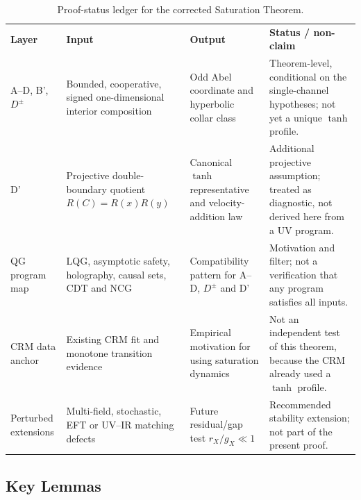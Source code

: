 \documentclass[aps,prd,twocolumn,superscriptaddress,nofootinbib]{revtex4-2}
\begin{document}
\begin{table}[t]
\caption{Proof-status ledger for the corrected Saturation Theorem.}
\label{tab:proof_status_ledger}
\small
\begin{ruledtabular}
\begin{tabular}{@{}llll@{}}
\parbox[t]{0.14\textwidth}{\textbf{Layer}} & \parbox[t]{0.24\textwidth}{\textbf{Input}} & \parbox[t]{0.22\textwidth}{\textbf{Output}} & \parbox[t]{0.27\textwidth}{\textbf{Status / non-claim}} \\
\parbox[t]{0.14\textwidth}{A--D, B', $D^\pm$} & \parbox[t]{0.24\textwidth}{Bounded, cooperative, signed one-dimensional interior composition} & \parbox[t]{0.22\textwidth}{Odd Abel coordinate and hyperbolic collar class} & \parbox[t]{0.27\textwidth}{Theorem-level, conditional on the single-channel hypotheses; not yet a unique $\tanh$ profile.} \\[0.6em]
\parbox[t]{0.14\textwidth}{D'} & \parbox[t]{0.24\textwidth}{Projective double-boundary quotient $R(C)=R(x)R(y)$} & \parbox[t]{0.22\textwidth}{Canonical $\tanh$ representative and velocity-addition law} & \parbox[t]{0.27\textwidth}{Additional projective assumption; treated as diagnostic, not derived here from a UV program.} \\[0.6em]
\parbox[t]{0.14\textwidth}{QG program map} & \parbox[t]{0.24\textwidth}{LQG, asymptotic safety, holography, causal sets, CDT and NCG} & \parbox[t]{0.22\textwidth}{Compatibility pattern for A--D, $D^\pm$ and D'} & \parbox[t]{0.27\textwidth}{Motivation and filter; not a verification that any program satisfies all inputs.} \\[0.6em]
\parbox[t]{0.14\textwidth}{CRM data anchor} & \parbox[t]{0.24\textwidth}{Existing CRM fit and monotone transition evidence} & \parbox[t]{0.22\textwidth}{Empirical motivation for using saturation dynamics} & \parbox[t]{0.27\textwidth}{Not an independent test of this theorem, because the CRM already used a $\tanh$ profile.} \\[0.6em]
\parbox[t]{0.14\textwidth}{Perturbed extensions} & \parbox[t]{0.24\textwidth}{Multi-field, stochastic, EFT or UV--IR matching defects} & \parbox[t]{0.22\textwidth}{Future residual/gap test $r_X/g_X \ll 1$} & \parbox[t]{0.27\textwidth}{Recommended stability extension; not part of the present proof.} \\
\end{tabular}
\end{ruledtabular}
\end{table}

\subsection{Key Lemmas}
\end{document}
